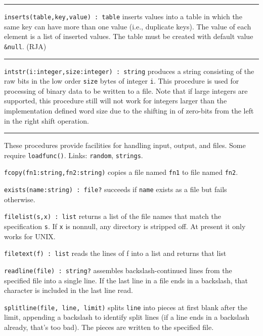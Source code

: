 \vspace{0.25cm}\hrule{}

\texttt{inserts(table,key,value) : table} inserts values into a table in
which the same key can have more than one value (i.e.,
duplicate keys). The value of each element is a
list of inserted values. The table must be created with default value
\texttt{\&null}. (RJA)

\vspace{0.25cm}\hrule{}

\texttt{intstr(i:integer,size:integer) : string} produces a string
consisting of the raw bits in the low order \texttt{size} bytes of
integer \texttt{i}. This procedure is used for processing of
binary data to be written to a file. Note that if
large integers are supported, this procedure still will not work for
integers larger than the implementation defined word size due to the
shifting in of zero-bits from the left in the right shift operation.


\vspace{0.25cm}\hrule{}

These procedures provide facilities for handling input,
output, and files. Some require
\texttt{loadfunc()}. Links: \texttt{random}, \texttt{strings}.

\texttt{fcopy(fn1:string,fn2:string)} copies a file named \texttt{fn1}
to file named \texttt{fn2}.

\texttt{exists(name:string) : file?} succeeds if \texttt{name} exists as
a file but fails otherwise.

\texttt{filelist(s,x) : list} returns a list of the file names that
match the specification \texttt{s}. If \texttt{x} is nonnull, any
directory is stripped off. At present it only works for UNIX.

\texttt{filetext(f) : list} reads the lines of f into a list and returns
that list

\texttt{readline(file) : string?} assembles backslash-continued lines
from the specified file into a single line. If the last line in a file
ends in a backslash, that character is included in the last line read.

\texttt{splitline(file, line, limit)} splits \texttt{line} into pieces
at first blank after the limit, appending a backslash to identify split
lines (if a line ends in a backslash already, that's
too bad). The pieces are written to the specified file.

